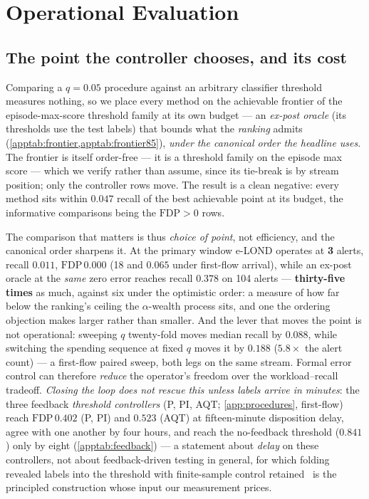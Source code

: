\documentclass[conference]{IEEEtran}
\newcommand{\FDP}{\mathrm{FDP}}
\begin{document}
\section{Operational Evaluation}\label{sec:operational}

\subsection{The point the controller chooses, and its cost}

Comparing a $q=0.05$ procedure against an arbitrary classifier threshold measures nothing, so we place
every method on the achievable frontier of the episode-max-score threshold family at its own budget ---
an \emph{ex-post oracle} (its thresholds use the test labels) that bounds what the \emph{ranking} admits
(\cref{apptab:frontier,apptab:frontier85}), \emph{under the canonical order the headline uses}. The
frontier is itself order-free --- it is a threshold family on the episode max score --- which we verify
rather than assume, since its tie-break is by stream position; only the controller rows move. The result
is a clean negative: every method sits within $0.047$ recall of the best achievable point at its budget,
the informative comparisons being the $\FDP>0$ rows.

The comparison that matters is thus \emph{choice of point}, not efficiency, and the canonical order
sharpens it. At the primary window e-LOND operates at \textbf{3} alerts, recall $0.011$, $\FDP\,0.000$
(18 and $0.065$ under first-flow arrival), while an ex-post oracle at the \emph{same} zero error reaches
recall $0.378$ on 104 alerts --- \textbf{thirty-five times} as much, against six under the optimistic
order: a measure of how far below the ranking's ceiling the $\alpha$-wealth process sits, and one the
ordering objection makes larger rather than smaller. And the lever that moves the point is not
operational: sweeping $q$ twenty-fold moves median recall by $0.088$, while switching the spending
sequence at fixed $q$ moves it by $0.188$ ($5.8\times$ the alert count) --- a first-flow paired sweep,
both legs on the same stream. Formal error control can
therefore \emph{reduce} the operator's freedom over the workload--recall tradeoff. \emph{Closing the
loop does not rescue this unless labels arrive in minutes}: the three feedback \emph{threshold
controllers} (P, PI, AQT; \cref{app:procedures}, first-flow) reach $\FDP\,0.402$ (P, PI) and $0.523$ (AQT) at
fifteen-minute disposition delay, agree with one another by four hours, and reach the no-feedback threshold
($0.841$) only by eight (\cref{apptab:feedback}) --- a
statement about \emph{delay} on these controllers, not about feedback-driven testing in general, for
which folding revealed labels into the threshold with finite-sample control
retained~\cite{lu2026gaif} is the principled construction whose input our measurement prices.
\end{document}
